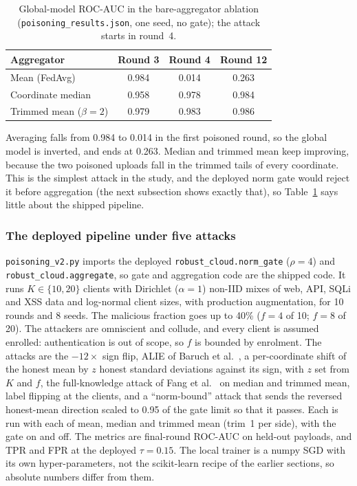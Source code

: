 \begin{table}[t]
\centering
\caption{Global-model ROC-AUC in the bare-aggregator ablation (\texttt{poisoning\_results.json}, one seed, no gate); the attack starts in round~4.}
\label{tab:eval-poison}
\begin{tabular}{@{}lccc@{}}
\toprule
\textbf{Aggregator} & \textbf{Round 3} & \textbf{Round 4} & \textbf{Round 12} \\ \midrule
Mean (FedAvg) & 0.984 & 0.014 & 0.263 \\
Coordinate median & 0.958 & 0.978 & 0.984 \\
Trimmed mean ($\beta{=}2$) & 0.979 & 0.983 & 0.986 \\ \bottomrule
\end{tabular}
\end{table}

Averaging falls from 0.984 to 0.014 in the first poisoned round, so the global model is inverted, and ends at 0.263. Median and trimmed mean keep improving, because the two poisoned uploads fall in the trimmed tails of every coordinate. This is the simplest attack in the study, and the deployed norm gate would reject it before aggregation (the next subsection shows exactly that), so Table~\ref{tab:eval-poison} says little about the shipped pipeline.

\subsubsection*{The deployed pipeline under five attacks}

\texttt{poisoning\_v2.py} imports the deployed \texttt{robust\_cloud.norm\_gate} ($\rho=4$) and \texttt{robust\_cloud.aggregate}, so gate and aggregation code are the shipped code. It runs $K\in\{10,20\}$ clients with Dirichlet ($\alpha=1$) non-IID mixes of web, API, SQLi and XSS data and log-normal client sizes, with production augmentation, for 10 rounds and 8 seeds. The malicious fraction goes up to 40\% ($f=4$ of 10; $f=8$ of 20). The attackers are omniscient and collude, and every client is assumed enrolled: authentication is out of scope, so $f$ is bounded by enrolment. The attacks are the $-12\times$ sign flip, ALIE of Baruch et al.~\cite{baruch2019alie}, a per-coordinate shift of the honest mean by $z$ honest standard deviations against its sign, with $z$ set from $K$ and $f$, the full-knowledge attack of Fang et al.~\cite{fang2020} on median and trimmed mean, label flipping at the clients, and a ``norm-bound'' attack that sends the reversed honest-mean direction scaled to 0.95 of the gate limit so that it passes. Each is run with each of mean, median and trimmed mean (trim~1 per side), with the gate on and off. The metrics are final-round ROC-AUC on held-out payloads, and TPR and FPR at the deployed $\tau=0.15$. The local trainer is a numpy SGD with its own hyper-parameters, not the scikit-learn recipe of the earlier sections, so absolute numbers differ from them.


